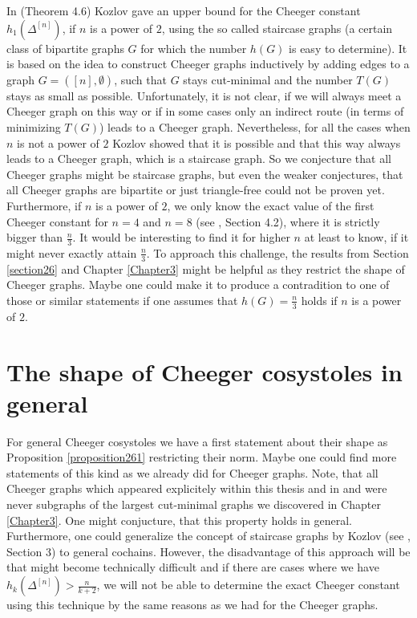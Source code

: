 In \cite{1} (Theorem 4.6) Kozlov gave an upper bound for the Cheeger constant \(h_1(\Delta^{[n]})\), if \(n\) is a power of \(2\), using the so called staircase graphs (a certain class of bipartite graphs \(G\) for which the number \(h(G)\) is easy to determine). It is based on the idea to construct Cheeger graphs inductively by adding edges to a graph \(G=([n],\emptyset)\), such that \(G\) stays cut-minimal and the number \(T(G)\) stays as small as possible. Unfortunately, it is not clear, if we will always meet a Cheeger graph on this way or if in some cases only an indirect route (in terms of minimizing \(T(G)\)) leads to a Cheeger graph. Nevertheless, for all the cases when \(n\) is not a power of \(2\) Kozlov showed that it is possible and that this way always leads to a Cheeger graph, which is a staircase graph. So we conjecture that all Cheeger graphs might be staircase graphs, but even the weaker conjectures, that all Cheeger graphs are bipartite or just triangle-free could not be proven yet. Furthermore, if \(n\) is a power of \(2\), we only know the exact value of the first Cheeger constant for \(n=4\) and \(n=8\) (see \cite{1}, Section 4.2), where it is strictly bigger than \(\frac{n}{3}\). It would be interesting to find it for higher \(n\) at least to know, if it might never exactly attain \(\frac{n}{3}\). To approach this challenge, the results from Section \ref{section26} and Chapter \ref{Chapter3} might be helpful as they restrict the shape of Cheeger graphs. Maybe one could make it to produce a contradition to one of those or similar statements if one assumes that \(h(G)=\frac{n}{3}\) holds if \(n\) is a power of \(2\).

\section{The shape of Cheeger cosystoles in general}

For general Cheeger cosystoles we have a first statement about their shape as Proposition \ref{proposition261} restricting their norm. Maybe one could find more statements of this kind as we already did for Cheeger graphs. Note, that all Cheeger graphs which appeared explicitely within this thesis and in \cite{1} and \cite{6} were never subgraphs of the largest cut-minimal graphs we discovered in Chapter \ref{Chapter3}. One might conjucture, that this property holds in general. Furthermore, one could generalize the concept of staircase graphs by Kozlov (see \cite{1}, Section 3) to general cochains. However, the disadvantage of this approach will be that might become technically difficult and if there are cases where we have \(h_k(\Delta^{[n]})>\frac{n}{k+2}\), we will not be able to determine the exact Cheeger constant using this technique by the same reasons as we had for the Cheeger graphs.

